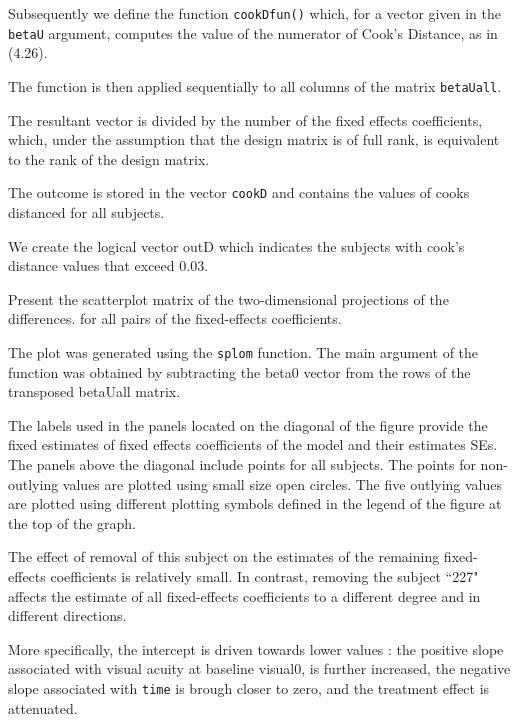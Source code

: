 \documentclass[a4paper,12pt]{article}
\begin{document}
Subsequently we define the function \texttt{cookDfun()} which, for a vector given in
the \texttt{betaU} argument, computes the value of the numerator of Cook's Distance, as in (4.26).

The function is then applied sequentially to all columns of the matrix \texttt{betaUall}.


The resultant vector is divided by the number of the fixed effects coefficients, which, under the assumption that the design matrix is of full rank, 
is equivalent to the rank of the design matrix.



The outcome is stored in the vector \texttt{cookD} and contains the values of cooks distanced for all subjects.

We create the logical vector outD which indicates the subjects with cook's distance values that exceed 0.03.

Present the scatterplot matrix of the two-dimensional projections of the differences.
for all pairs of the fixed-effects coefficients.

The plot was generated using the \texttt{splom} function. The main argument of the 
function was obtained by subtracting the beta0 vector from the rows of the transposed
betaUall matrix.

The labels used in the panels located on the diagonal of the figure provide the fixed estimates of fixed effects coefficients
of the model and their estimates SEs.
The panels above the diagonal include points for all subjects.
The points for non-outlying values are plotted using small size open circles.
The five outlying values are plotted using different plotting symbols defined in the
legend of the figure at the top of the graph.


The effect of removal of this subject on the estimates of the remaining fixed-effects coefficients is relatively small.
In contrast, removing the subject ``227" affects the estimate of all fixed-effects coefficients to a different degree and in different directions.

More specifically, the intercept is driven towards lower values : the positive slope associated with visual acuity at baseline visual0, is further increased, the negative slope associated with \texttt{time} is brough closer to zero, and the treatment effect is attenuated.
\end{document}
